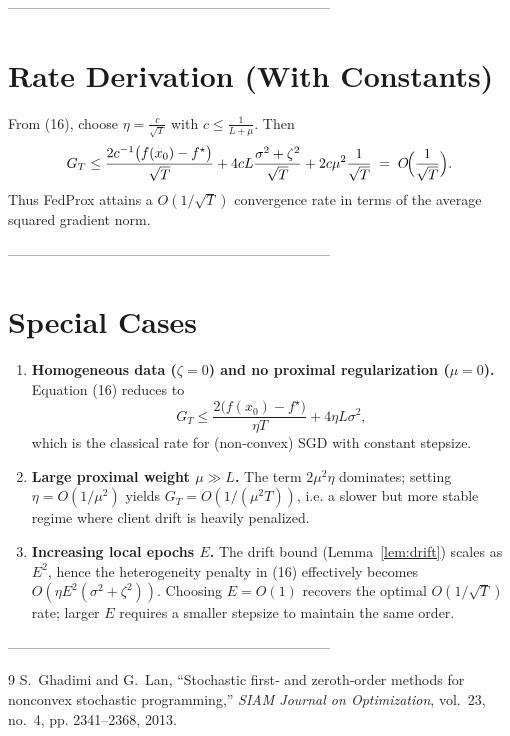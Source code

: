 \documentclass{article}
\begin{document}
---------------------------------------------------------------------

\section*{Rate Derivation (With Constants)}
From (16), choose $\eta = \frac{c}{\sqrt{T}}$ with $c\le\frac{1}{L+\mu}$.
Then
\[
G_T\le \frac{2c^{-1}\bigl(f(x_0)-f^{\star}\bigr)}{\sqrt{T}}
      +4cL\frac{\sigma^{2}+\zeta^{2}}{\sqrt{T}}
      +2c\mu^{2}\frac{1}{\sqrt{T}}
      \;=\;O\!\Bigl(\frac{1}{\sqrt{T}}\Bigr).
\]
Thus FedProx attains a $O(1/\sqrt{T})$ convergence rate in terms of the average squared gradient norm.

---------------------------------------------------------------------

\section*{Special Cases}
\begin{enumerate}
\item \textbf{Homogeneous data ($\zeta=0$) and no proximal regularization ($\mu=0$).}  
Equation (16) reduces to
\[
G_T\le \frac{2\bigl(f(x_0)-f^{\star}\bigr)}{\eta T}+4\eta L\sigma^{2},
\]
which is the classical rate for (non‑convex) SGD with constant stepsize.

\item \textbf{Large proximal weight $\mu\gg L$.}  
The term $2\mu^{2}\eta$ dominates; setting $\eta=O(1/\mu^{2})$ yields $G_T=O(1/(\mu^{2}T))$, i.e. a slower but more stable regime where client drift is heavily penalized.

\item \textbf{Increasing local epochs $E$.}  
The drift bound (Lemma~\ref{lem:drift}) scales as $E^{2}$, hence the heterogeneity penalty in (16) effectively becomes $O(\eta E^{2}(\sigma^{2}+\zeta^{2}))$. Choosing $E=O(1)$ recovers the optimal $O(1/\sqrt{T})$ rate; larger $E$ requires a smaller stepsize to maintain the same order.
\end{enumerate}

---------------------------------------------------------------------

\begin{thebibliography}{9}
S.~Ghadimi and G.~Lan, ``Stochastic first‑ and zeroth‑order methods for nonconvex stochastic programming,'' \emph{SIAM Journal on Optimization}, vol.~23, no.~4, pp. 2341–2368, 2013.
\end{thebibliography}
\end{document}
